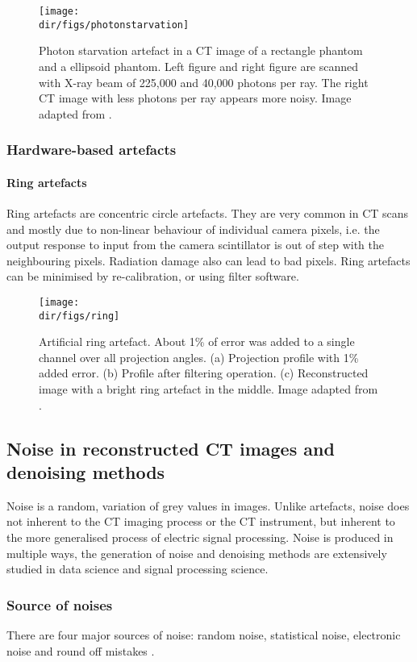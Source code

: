 \begin{figure}
    \centering
    \texttt{[image: \\dir/figs/photonstarvation]}
    \caption{Photon starvation artefact in a CT image of a rectangle phantom and a ellipsoid phantom. Left figure and right figure are scanned with X-ray beam of 225,000 and 40,000 photons per ray. The right CT image with less photons per ray appears more noisy. Image adapted from \citep{mori2013photon}.}
    \label{photonstarvation}
\end{figure}


\subsubsection{Hardware-based artefacts}
\paragraph{Ring artefacts} 
Ring artefacts are concentric circle artefacts. They are very common in CT scans and mostly due to non-linear behaviour of individual camera pixels, i.e. the output response to input from the camera scintillator is out of step with the neighbouring pixels. Radiation damage also can lead to bad pixels. Ring artefacts can be minimised by re-calibration, or using filter software.

\begin{figure}[htbp]
  \centering
  \texttt{[image: \\dir/figs/ring]}
  \caption{Artificial ring artefact. About 1\% of error was added to a single channel over all projection angles. (a) Projection profile with 1\% added error. (b) Profile after filtering operation. (c) Reconstructed image with a bright ring artefact in the middle. Image adapted from \citet{hsieh2003computed}.}
  \label{fbp}
\end{figure}

\subsection{Noise in reconstructed CT images and denoising methods}
Noise is a random, variation of grey values in images. Unlike artefacts, noise does not inherent to the CT imaging process or the CT instrument, but inherent to the more generalised process of electric signal processing. Noise is produced in multiple ways, the generation of noise and denoising methods are extensively studied in data science and signal processing science.

\subsubsection{Source of noises}
There are four major sources of noise: random noise, statistical noise, electronic noise and round off mistakes \citep{diwakar2018review}.

